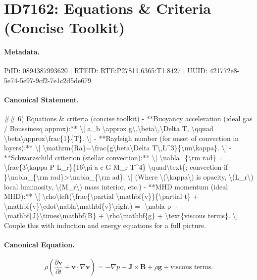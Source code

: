 \section*{ID7162: Equations \& Criteria (Concise Toolkit)}
\paragraph{Metadata.}
PiID: 0894387993620 | RTEID: RTE:P27811.6365:T1.8427 | UUID: 421772e8-5e74-5e97-9cf2-7e1c2d5de679

\paragraph{Canonical Statement.}
\#\# 6) Equations \& criteria (concise toolkit) - **Buoyancy acceleration (ideal gas / Boussinesq approx):** \textbackslash{}[ a\_b \textbackslash{}approx g\textbackslash{},\textbackslash{}beta\textbackslash{},\textbackslash{}Delta T, \textbackslash{}qquad \textbackslash{}beta\textbackslash{}approx\textbackslash{}frac\{1\}\{T\}. \textbackslash{}] - **Rayleigh number (for onset of convection in layers):** \textbackslash{}[ \textbackslash{}mathrm\{Ra\}=\textbackslash{}frac\{g\textbackslash{}beta\textbackslash{}Delta T\textbackslash{},L\textasciicircum{}3\}\{\textbackslash{}nu\textbackslash{}kappa\}. \textbackslash{}] - **Schwarzschild criterion (stellar convection):** \textbackslash{}[ \textbackslash{}nabla\_\{\textbackslash{}rm rad\} = \textbackslash{}frac\{3\textbackslash{}kappa P L\_r\}\{16\textbackslash{}pi a c G M\_r T\textasciicircum{}4\} \textbackslash{}quad\textbackslash{}text\{; convection if \}\textbackslash{}nabla\_\{\textbackslash{}rm rad\}>\textbackslash{}nabla\_\{\textbackslash{}rm ad\}. \textbackslash{}] (Where \textbackslash{}(\textbackslash{}kappa\textbackslash{}) is opacity, \textbackslash{}(L\_r\textbackslash{}) local luminosity, \textbackslash{}(M\_r\textbackslash{}) mass interior, etc.) - **MHD momentum (ideal MHD):** \textbackslash{}[ \textbackslash{}rho\textbackslash{}left(\textbackslash{}frac\{\textbackslash{}partial \textbackslash{}mathbf\{v\}\}\{\textbackslash{}partial t\} + \textbackslash{}mathbf\{v\}\textbackslash{}cdot\textbackslash{}nabla\textbackslash{}mathbf\{v\}\textbackslash{}right) = -\textbackslash{}nabla p + \textbackslash{}mathbf\{J\}\textbackslash{}times\textbackslash{}mathbf\{B\} + \textbackslash{}rho\textbackslash{}mathbf\{g\} + \textbackslash{}text\{viscous terms\}. \textbackslash{}] Couple this with induction and energy equations for a full picture.

\paragraph{Canonical Equation.}
\[
\rho\left(\frac{\partial \mathbf{v}}{\partial t} + \mathbf{v}\cdot\nabla\mathbf{v}\right) = -\nabla p + \mathbf{J}\times\mathbf{B} + \rho\mathbf{g} + \text{viscous terms}.
\]

